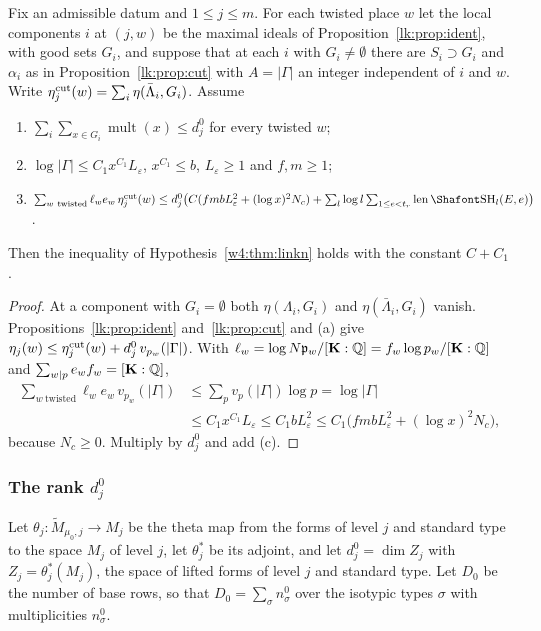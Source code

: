 \begin{proposition}\label{lk:prop:gd}
Fix an admissible datum and $1\le j\le m$. For each twisted place $w$ let the local components $i$ at $(j,w)$ be the maximal ideals of Proposition~\ref{lk:prop:ident}, with good sets $G_i$, and suppose that at each $i$ with $G_i\ne\emptyset$ there are $S_i\supset G_i$ and $\alpha_i$ as in Proposition~\ref{lk:prop:cut} with $A=\lvert\Gamma\rvert$ an integer independent of $i$ and $w$. Write $\eta^{\rm cut}_j(w)=\sum_i\eta(\bar\Lambda_i,G_i)$. Assume
\begin{enumerate}[leftmargin=*,label=(\alph*)]
\item $\sum_i\sum_{x\in G_i}\operatorname{mult}(x)\le d^0_j$ for every twisted $w$;
\item $\log\lvert\Gamma\rvert\le C_1x^{C_1}L_\varepsilon$, $x^{C_1}\le b$, $L_\varepsilon\ge1$ and $f,m\ge1$;
\item $\sum_{w\ \mathrm{twisted}}\ell_we_w\,\eta^{\rm cut}_j(w)\le d^0_j\big(C(fmbL_\varepsilon^2+(\log x)^2N_c)+\sum_l\log l\sum_{1\le e<t_r}\len\Sha_l(E,e)\big)$.
\end{enumerate}
Then the inequality of Hypothesis~\ref{w4:thm:linkn} holds with the constant $C+C_1$.
\end{proposition}

\begin{proof}
At a component with $G_i=\emptyset$ both $\eta(\Lambda_i,G_i)$ and $\eta(\bar\Lambda_i,G_i)$ vanish. Propositions~\ref{lk:prop:ident} and~\ref{lk:prop:cut} and (a) give $\eta_j(w)\le\eta^{\rm cut}_j(w)+d^0_j\,v_{p_w}(\lvert\Gamma\rvert)$. With $\ell_w=\log N\mathfrak p_w/[\mathbf K:\mathbb Q]=f_w\log p_w/[\mathbf K:\mathbb Q]$ and $\sum_{w\mid p}e_wf_w=[\mathbf K:\mathbb Q]$,
\[
\begin{aligned}
\sum_{w\ \mathrm{twisted}}\ell_we_w\,v_{p_w}(\lvert\Gamma\rvert)&\le\sum_pv_p(\lvert\Gamma\rvert)\log p=\log\lvert\Gamma\rvert\\ &\le C_1x^{C_1}L_\varepsilon\le C_1bL_\varepsilon^2\le C_1\big(fmbL_\varepsilon^2+(\log x)^2N_c\big),
\end{aligned}
\]
because $N_c\ge0$. Multiply by $d^0_j$ and add (c).
\end{proof}

\subsubsection*{The rank $d^0_j$}

Let $\theta_j\colon\widetilde M_{\mu_0,j}\to M_j$ be the theta map from the forms of level $j$ and standard type to the space $M_j$ of level $j$, let $\theta_j^*$ be its adjoint, and let $d^0_j=\dim Z_j$ with $Z_j=\theta_j^*(M_j)$, the space of lifted forms of level $j$ and standard type. Let $D_0$ be the number of base rows, so that $D_0=\sum_\sigma n^0_\sigma$ over the isotypic types $\sigma$ with multiplicities $n^0_\sigma$.

